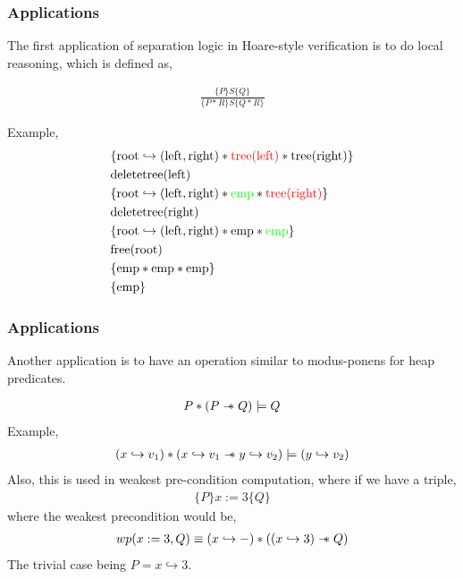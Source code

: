 \documentclass{beamer}
\newcommand\sepimp{\mathrel{-\mkern-6mu*}}
\begin{document}
\begin{frame}
\frametitle{Applications}
The first application of separation logic in Hoare-style verification is
to do local reasoning, which is defined as,

\begin{align*}
    \frac{\{P\} S \{Q\}}{\{P * R\} S \{Q * R\}}
\end{align*}

Example,
\begin{align*}
    & \{\textrm{root} \hookrightarrow (\textrm{left}, \textrm{right}) * \textcolor{red}{\textrm{tree(left)}} * \textrm{tree(right)}\} \\
    & \textrm{deletetree(left)} \\
    & \{\textrm{root} \hookrightarrow (\textrm{left}, \textrm{right}) * \textcolor{green}{\textrm{emp}} * \textcolor{red}{\textrm{tree(right)}}\} \\
    & \textrm{deletetree(right)} \\
    & \{\textrm{root} \hookrightarrow (\textrm{left}, \textrm{right}) * \textrm{emp} * \textcolor{green}{\textrm{emp}}\} \\
    & \textrm{free(root)} \\
    & \{\textrm{emp} * \textrm{emp} * \textrm{emp}\} \\
    & \{\textrm{emp}\}
\end{align*}
\end{frame}

\begin{frame}
\frametitle{Applications}
Another application is to have an operation similar to modus-ponens for heap predicates.

\begin{align*}
    P * (P \sepimp Q) \models Q
\end{align*}
Example,
\begin{align*}
    (x \hookrightarrow v_1) * (x \hookrightarrow v_1 \sepimp y \hookrightarrow v_2) \models (y \hookrightarrow v_2)
\end{align*}
Also, this is used in weakest pre-condition computation, where if we have a triple,
    \begin{align*}
    \{P\}x := 3\{Q\}
    \end{align*}
where the weakest precondition would be,
    \begin{align*}
        wp(x := 3, Q) \equiv (x \hookrightarrow -) * ((x \hookrightarrow 3) \sepimp Q)
    \end{align*}
The trivial case being $P = x \hookrightarrow 3$.
\end{frame}
\end{document}
